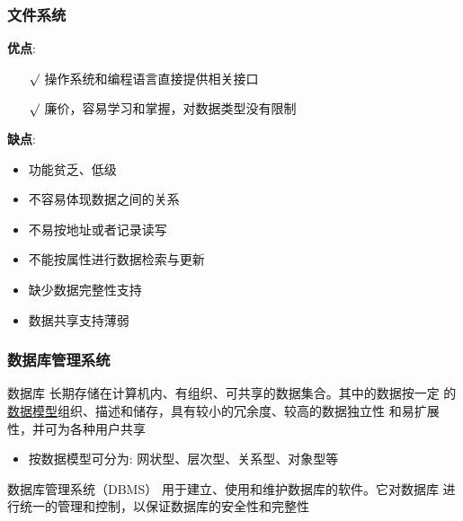 \documentclass[compress]{beamer}
\begin{document}
\begin{frame}
  \frametitle{文件系统}
  \textbf{优点}:
  \begin{itemize}
    \item [$\surd$] 操作系统和编程语言直接提供相关接口
    \item [$\surd$] 廉价，容易学习和掌握，对数据类型没有限制 
  \end{itemize}

  \textbf{缺点}:
  \begin{itemize}
    \item 功能贫乏、低级
    \item 不容易体现数据之间的关系
    \item 不易按地址或者记录读写
    \item 不能按属性进行数据检索与更新
    \item 缺少数据完整性支持
    \item 数据共享支持薄弱
  \end{itemize}
\end{frame}

\begin{frame}
  \frametitle{数据库管理系统}
  \begin{block}{数据库}
    长期存储在计算机内、有组织、可共享的数据集合。其中的数据按一定
    的\uline{数据模型}组织、描述和储存，具有较小的冗余度、较高的数据独立性
    和易扩展性，并可为各种用户共享 
  \begin{itemize}
    \item 按数据模型可分为: 网状型、层次型、关系型、对象型等
  \end{itemize}
\end{block}

\begin{block}{数据库管理系统（DBMS）} 
  用于建立、使用和维护数据库的软件。它对数据库
  进行统一的管理和控制，以保证数据库的安全性和完整性
\end{block}
\end{frame}
\end{document}
